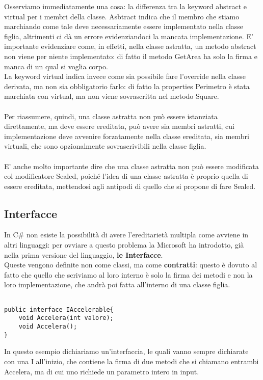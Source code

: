 \documentclass[]{article}
\begin{document}
Osserviamo immediatamente una cosa: la differenza tra la keyword abstract e virtual per i membri della classe. Asbtract indica che il membro che stiamo marchiando come tale deve necessariamente essere implementato nella classe figlia, 
altrimenti ci dà un errore evidenziandoci la mancata implementazione. E' importante evidenziare come, in effetti, nella classe astratta, un metodo abstract non viene per niente implementato: di fatto il metodo GetArea ha solo la firma e manca di un qual si voglia corpo.\\
La keyword virtual indica invece come sia possibile fare l'override nella classe derivata, ma non sia obbligatorio farlo: di fatto la properties Perimetro è stata marchiata con virtual, ma non viene sovrascritta nel metodo Square.\\ \\
Per riassumere, quindi, una classe astratta non può essere istanziata direttamente, ma deve essere ereditata, può avere sia membri astratti, cui implementazione deve avvenire forzatamente nella classe ereditata, sia membri virtuali, che
sono opzionalmente sovrascrivibili nella classe figlia. \\ \\
E' anche molto importante dire che una classe astratta non può essere modificata col modificatore Sealed, poiché l'idea
di una classe astratta è proprio quella di essere ereditata, mettendosi agli antipodi di quello che si propone di fare Sealed.

\subsection{Interfacce}
In C\# non esiste la possibilità di avere l'ereditarietà multipla come avviene in altri
linguaggi: per ovviare a questo problema la Microsoft ha introdotto, già nella prima versione del linguaggio, \textbf{le Interfacce}. \\
Queste vengono definite non come classi, ma come \textbf{contratti}: questo è dovuto al
fatto che quello che scriviamo al loro interno è solo la firma dei metodi e non la loro
implementazione, che andrà poi fatta all'interno di una classe figlia.

\begin{verbatim}

public interface IAccelerable{
    void Accelera(int valore);
    void Accelera();
}
\end{verbatim}
In questo esempio dichiariamo un'interfaccia, le quali vanno sempre dichiarate con una I
all'inizio, che contiene la firma di due metodi che si chiamano entrambi Accelera, ma di cui
uno richiede un parametro intero in input.
\end{document}
